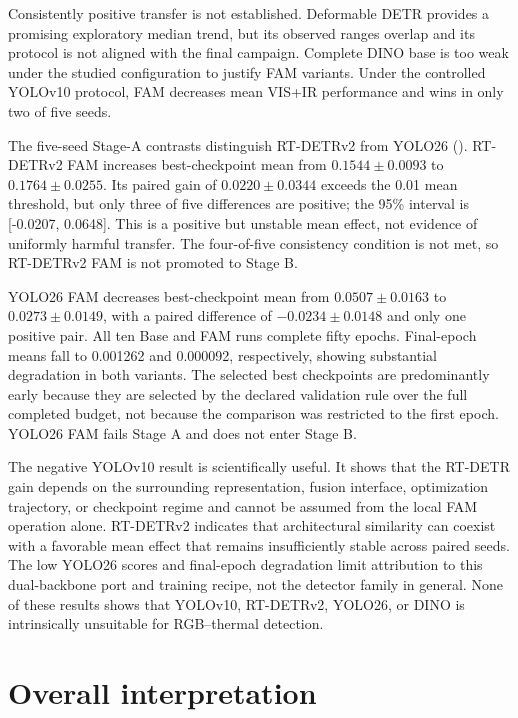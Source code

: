 Consistently positive transfer is not established. Deformable DETR provides a
promising exploratory median trend, but its observed ranges overlap and its
protocol is not aligned with the final campaign. Complete DINO base is too weak
under the studied configuration to justify FAM variants. Under the controlled
YOLOv10 protocol, FAM decreases mean VIS+IR performance and wins in only two of
five seeds.

The five-seed Stage-A contrasts distinguish RT-DETRv2 from YOLO26
(). RT-DETRv2
FAM increases best-checkpoint mean \mapfifty{} from \(0.1544\pm0.0093\) to
\(0.1764\pm0.0255\). Its paired gain of \(0.0220\pm0.0344\) exceeds the
0.01 mean threshold, but only three of five differences are positive; the
95\% interval is [-0.0207, 0.0648]. This is a positive but unstable mean effect,
not evidence of uniformly harmful transfer. The four-of-five consistency
condition is not met, so RT-DETRv2 FAM is not promoted to Stage B.

YOLO26 FAM decreases best-checkpoint mean \mapfifty{} from
\(0.0507\pm0.0163\) to \(0.0273\pm0.0149\), with a paired difference of
\(-0.0234\pm0.0148\) and only one positive pair. All ten Base and FAM
runs complete fifty epochs. Final-epoch means fall to 0.001262 and 0.000092,
respectively, showing substantial degradation in both variants. The selected
best checkpoints are predominantly early because they are selected by the
declared validation rule over the full completed budget, not because the
comparison was restricted to the first epoch. YOLO26 FAM fails Stage A and
does not enter Stage B.

The negative YOLOv10 result is scientifically useful. It shows that the RT-DETR
gain depends on the surrounding representation, fusion interface, optimization
trajectory, or checkpoint regime and cannot be assumed from the local FAM
operation alone. RT-DETRv2 indicates that architectural similarity can coexist
with a favorable mean effect that remains insufficiently stable across paired
seeds. The low YOLO26 scores and final-epoch degradation limit attribution to
this dual-backbone port and training recipe, not the detector family in
general. None of these results shows that YOLOv10,
RT-DETRv2, YOLO26, or DINO is intrinsically unsuitable for RGB--thermal
detection.

\section{Overall interpretation}

